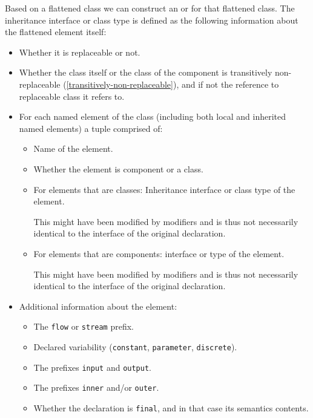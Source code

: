 Based on a flattened class we can construct an  or  for that flattened class.
The inheritance interface or class type is defined as the following information about the flattened element itself:
\begin{itemize}
\item
  Whether it is replaceable or not.
\item
  Whether the class itself or the class of the component is transitively non-replaceable (\cref{transitively-non-replaceable}), and if not the reference to replaceable class it refers to.
\item
  For each named element of the class (including both local and inherited named elements) a tuple comprised of:
  \begin{itemize}
  \item
    Name of the element.
  \item
    Whether the element is component or a class.
  \item
    For elements that are classes: Inheritance interface or class type of the element.
    \begin{nonnormative}
    This might have been modified by modifiers and is thus not necessarily identical to the interface of the original declaration.
    \end{nonnormative}
  \item
    For elements that are components: interface or type of the element.
    \begin{nonnormative}
    This might have been modified by modifiers and is thus not necessarily identical to the interface of the original declaration.
    \end{nonnormative}
  \end{itemize}
\item
  Additional information about the element:
  \begin{itemize}
  \item
    The \lstinline!flow! or \lstinline!stream! prefix.
  \item
    Declared variability (\lstinline!constant!, \lstinline!parameter!, \lstinline!discrete!).
  \item
    The prefixes \lstinline!input! and \lstinline!output!.
  \item
    The prefixes \lstinline!inner! and/or \lstinline!outer!.
  \item
    Whether the declaration is \lstinline!final!, and in that case its semantics contents.

\end{itemize}
\end{itemize}
